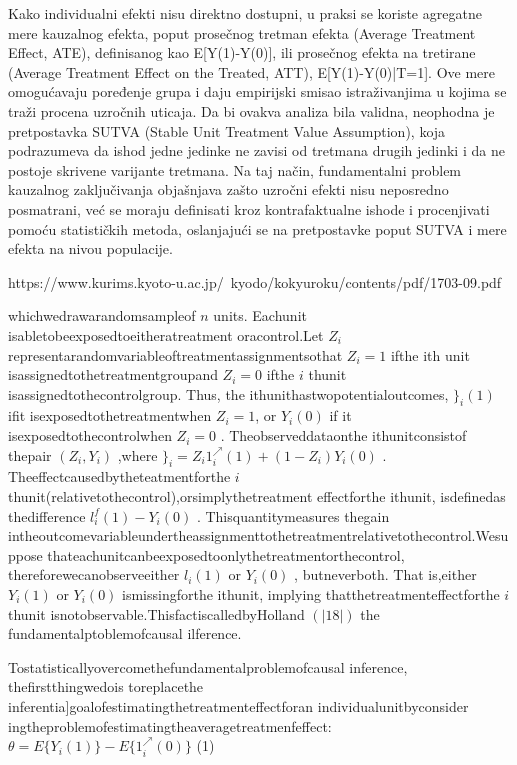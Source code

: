 \documentclass[12pt, a4paper]{article}
\begin{document}
Kako individualni efekti nisu direktno dostupni, u praksi se koriste agregatne mere kauzalnog efekta, poput prosečnog tretman efekta 
(Average Treatment Effect, ATE), definisanog kao E[Y(1)-Y(0)], ili prosečnog efekta na tretirane (Average Treatment Effect on the 
Treated, ATT), E[Y(1)-Y(0)|T=1]. Ove mere omogućavaju poređenje grupa i daju empirijski smisao istraživanjima u kojima se traži 
procena uzročnih uticaja. Da bi ovakva analiza bila validna, neophodna je pretpostavka SUTVA (Stable Unit Treatment Value Assumption),
 koja podrazumeva da ishod jedne jedinke ne zavisi od tretmana drugih jedinki i da ne postoje skrivene varijante tretmana.
Na taj način, fundamentalni problem kauzalnog zaključivanja objašnjava zašto uzročni efekti nisu neposredno posmatrani, 
već se moraju definisati kroz kontrafaktualne ishode i procenjivati pomoću statističkih metoda, oslanjajući se na pretpostavke
 poput SUTVA i mere efekta na nivou populacije.

 https://www.kurims.kyoto-u.ac.jp/~kyodo/kokyuroku/contents/pdf/1703-09.pdf

  whichwedrawarandomsampleof $n$
 units. Eachunit isabletobeexposedtoeitheratreatment
 oracontrol.Let $Z_{i}$
 representarandomvariableoftreatmentassignmentsothat $Z_{i}=1$ ifthe ith
 unit isassignedtothetreatmentgroupand $Z_{i}=0$ ifthe $i$
 thunit isassignedtothecontrolgroup.
 Thus, the ithunithastwopotentialoutcomes, $\}_{i} (1)$
 ifit isexposedtothetreatmentwhen $Z_{i}=1$,
 or $Y_{i}(0)$
 if it isexposedtothecontrolwhen $Z_{i}=0$ . Theobserveddataonthe ithunitconsistof
 thepair $(Z_{i},Y_{i})$ ,where
 $\}_{i} =Z_{i}1_{i}^{\nearrow}(1)+(1-Z_{i})Y_{i}(0)$
 .
 Theeffectcausedbytheteatmentforthe $i$
 thunit(relativetothecontrol),orsimplythetreatment
 effectforthe ithunit, isdefinedas thedifference $l_{i}^{f}(1)-Y_{i}(0)$ . Thisquantitymeasures thegain
 intheoutcomevariableundertheassignmenttothetreatmentrelativetothecontrol.Wesuppose
 thateachunitcanbeexposedtoonlythetreatmentorthecontrol, thereforewecanobserveeither
 $l_{i}(1)$
 or $Y_{i}(0)$ , butneverboth. That is,either $Y_{i}(1)$
 or $Y_{i}(0)$
 ismissingforthe ithunit, implying
 thatthetreatmenteffectforthe $i$
 thunit isnotobservable.ThisfactiscalledbyHolland $(|18|)$ the
 fundamentalptoblemofcausal ilference.

  Tostatisticallyovercomethefundamentalproblemofcausal inference, thefirstthingwedois
 toreplacethe inferentia]goalofestimatingthetreatmenteffectforan individualunitbyconsider
ingtheproblemofestimatingtheaveragetreatmenfeffect:
 $\theta=E\{Y_{i}(1)\}-E\{1_{i}^{\nearrow}(0)\}$ (1)
\end{document}

